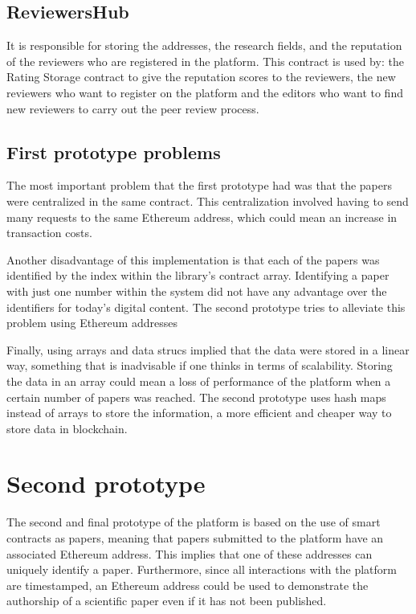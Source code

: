 \subsection*{ReviewersHub}
\label{sec:reviewershub}

It is responsible for storing the addresses, the research fields, and the
reputation of the reviewers who are registered in the platform. This contract is
used by: the Rating Storage contract to give the reputation scores to the
reviewers, the new reviewers who want to register on the platform and the
editors who want to find new reviewers to carry out the peer review process.

\subsection*{First prototype problems}
\label{sec:first-prot-probl}

The most important problem that the first prototype had was that the papers were
centralized in the same contract. This centralization involved having to send
many requests to the same Ethereum address, which could mean an increase in
transaction costs.

Another disadvantage of this implementation is that each of the papers was
identified by the index within the library's contract array. Identifying a paper
with just one number within the system did not have any advantage over the
identifiers for today's digital content. The second prototype tries to alleviate
this problem using Ethereum addresses

Finally, using arrays and data strucs implied that the data were stored in a
linear way, something that is inadvisable if one thinks in terms of scalability.
Storing the data in an array could mean a loss of performance of the platform
when a certain number of papers was reached. The second prototype uses hash maps
instead of arrays to store the information, a more efficient and cheaper way to
store data in blockchain.


\section{Second prototype}
\label{sec:second-prototype}

The second and final prototype of the platform is based on the use of smart
contracts as papers, meaning that papers submitted to the platform have an
associated Ethereum address. This implies that one of these addresses can
uniquely identify a paper. Furthermore, since all interactions with the platform
are timestamped, an Ethereum address could be used to demonstrate the authorship
of a scientific paper even if it has not been published.

